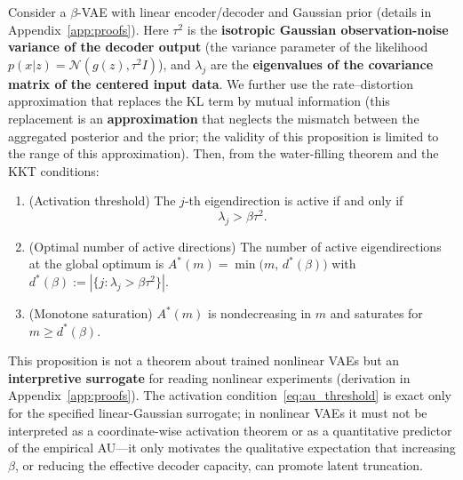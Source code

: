 \documentclass[make,article,submit,pdftex,moreauthors]{Definitions/mdpi}
\newcommand{\dstar}{d^{*}(\beta)}
\begin{document}
\begin{Proposition}\label{thm:linear_vae}
Consider a $\beta$-VAE with linear encoder/decoder and Gaussian prior
(details in Appendix~\ref{app:proofs}).
Here $\tau^2$ is the \textbf{isotropic Gaussian observation-noise variance
of the decoder output} (the variance parameter of the likelihood
$p(x|z) = \mathcal{N}(g(z), \tau^2 I)$), and $\lambda_j$ are the
\textbf{eigenvalues of the covariance matrix of the centered input data}.
We further use the rate--distortion approximation that replaces the KL term
by mutual information (this replacement is an \textbf{approximation} that
neglects the mismatch between the aggregated posterior and the prior; the
validity of this proposition is limited to the range of this
approximation).
Then, from the water-filling theorem and the KKT conditions:
\begin{enumerate}
  \item (Activation threshold) The $j$-th eigendirection is active if and
        only if
        \begin{equation}
          \lambda_j > \beta \tau^2 .
          \label{eq:au_threshold}
        \end{equation}
  \item (Optimal number of active directions)
        The number of active eigendirections at the global optimum is
        $A^*(m) = \min\bigl(m,\, \dstar\bigr)$ with
        $\dstar := |\{j : \lambda_j > \beta\tau^2\}|$.
  \item (Monotone saturation) $A^*(m)$ is nondecreasing in $m$ and
        saturates for $m \geq \dstar$.
\end{enumerate}
This proposition is not a theorem about trained nonlinear VAEs but an
\textbf{interpretive surrogate} for reading nonlinear experiments
(derivation in Appendix~\ref{app:proofs}).
The activation condition~\eqref{eq:au_threshold} is exact only for the
specified linear-Gaussian surrogate; in nonlinear VAEs it must not be
interpreted as a coordinate-wise activation theorem or as a quantitative
predictor of the empirical AU---it only motivates the qualitative
expectation that increasing $\beta$, or reducing the effective decoder
capacity, can promote latent truncation.
\end{Proposition}
\end{document}
